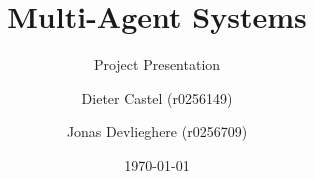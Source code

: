 \documentclass[12pt,t]{beamer}
\title{Multi-Agent Systems}
\subtitle{Project Presentation}
\author{Dieter Castel (r0256149) \and Jonas Devlieghere (r0256709)}
\institute{KU Leuven}
\date{\today}
\begin{document}
\frame{\titlepage}
\end{document}
